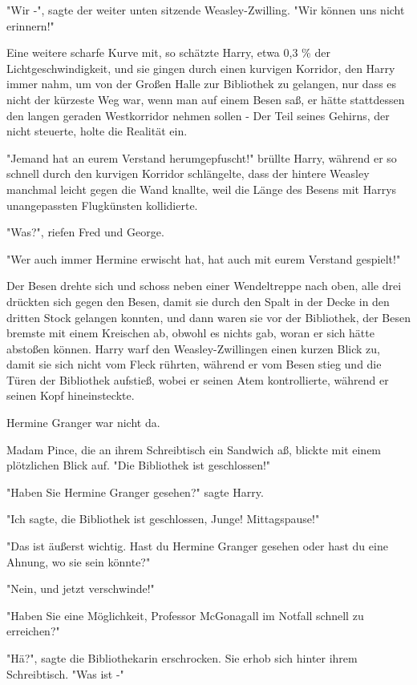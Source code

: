 {"Wir -", sagte der weiter unten sitzende Weasley-Zwilling. "Wir können uns nicht erinnern!"

Eine weitere scharfe Kurve mit, so schätzte Harry, etwa 0,3 \% der Lichtgeschwindigkeit, und sie gingen durch einen kurvigen Korridor, den Harry immer nahm, um von der Großen Halle zur Bibliothek zu gelangen, nur dass es nicht der kürzeste Weg war, wenn man auf einem Besen saß, er hätte stattdessen den langen geraden Westkorridor nehmen sollen - Der Teil seines Gehirns, der nicht steuerte, holte die Realität ein.

"Jemand hat an eurem Verstand herumgepfuscht!" brüllte Harry, während er so schnell durch den kurvigen Korridor schlängelte, dass der hintere Weasley manchmal leicht gegen die Wand knallte, weil die Länge des Besens mit Harrys unangepassten Flugkünsten kollidierte.

"Was?", riefen Fred und George.

"Wer auch immer Hermine erwischt hat, hat auch mit eurem Verstand gespielt!"

Der Besen drehte sich und schoss neben einer Wendeltreppe nach oben, alle drei drückten sich gegen den Besen, damit sie durch den Spalt in der Decke in den dritten Stock gelangen konnten, und dann waren sie vor der Bibliothek, der Besen bremste mit einem Kreischen ab, obwohl es nichts gab, woran er sich hätte abstoßen können. Harry warf den Weasley-Zwillingen einen kurzen Blick zu, damit sie sich nicht vom Fleck rührten, während er vom Besen stieg und die Türen der Bibliothek aufstieß, wobei er seinen Atem kontrollierte, während er seinen Kopf hineinsteckte.

Hermine Granger war nicht da.

Madam Pince, die an ihrem Schreibtisch ein Sandwich aß, blickte mit einem plötzlichen Blick auf. "Die Bibliothek ist geschlossen!"

"Haben Sie Hermine Granger gesehen?" sagte Harry.

"Ich sagte, die Bibliothek ist geschlossen, Junge! Mittagspause!"

"Das ist äußerst wichtig. Hast du Hermine Granger gesehen oder hast du eine Ahnung, wo sie sein könnte?"

"Nein, und jetzt verschwinde!"

"Haben Sie eine Möglichkeit, Professor McGonagall im Notfall schnell zu erreichen?"

"Hä?", sagte die Bibliothekarin erschrocken. Sie erhob sich hinter ihrem Schreibtisch. "Was ist -"

}
